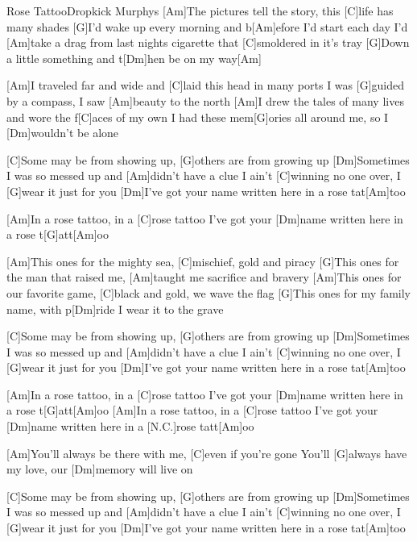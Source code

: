 \documentclass[../main.tex]{subfiles}
\begin{document}
\begin{song}{Rose Tattoo}{Dropkick Murphys}{}
[Am]The pictures tell the story, this [C]life has many shades
[G]I’d wake up every morning and b[Am]efore I’d start each day
I’d [Am]take a drag from last nights cigarette that [C]smoldered in it’s tray
[G]Down a little something and t[Dm]hen be on my way[Am]{\hh}

[Am]I traveled far and wide and [C]laid this head in many ports
I was [G]guided by a compass, I saw [Am]beauty to the north
[Am]I drew the tales of many lives and wore the f[C]aces of my own
I had these mem[G]ories all around me, so I [Dm]wouldn’t be alone

[C]Some may be from showing up, [G]others are from growing up
[Dm]Sometimes I was so messed up and [Am]didn’t have a clue
I ain’t [C]winning no one over, I [G]wear it just for you
[Dm]I’ve got your name written here in a rose tat[Am]too

[Am]In a rose tattoo, in a [C]rose tattoo
I’ve got your [Dm]name written here in a rose t[G]att[Am]oo

[Am]This ones for the mighty sea, [C]mischief, gold and piracy
[G]This ones for the man that raised me, [Am]taught me sacrifice and bravery
[Am]This ones for our favorite game, [C]black and gold, we wave the flag
[G]This ones for my family name, with p[Dm]ride I wear it to the grave

[C]Some may be from showing up, [G]others are from growing up
[Dm]Sometimes I was so messed up and [Am]didn’t have a clue
I ain’t [C]winning no one over, I [G]wear it just for you
[Dm]I’ve got your name written here in a rose tat[Am]too

[Am]In a rose tattoo, in a [C]rose tattoo
I’ve got your [Dm]name written here in a rose t[G]att[Am]oo
[Am]In a rose tattoo, in a [C]rose tattoo
I’ve got your [Dm]name written here in a [N.C.]rose tatt[Am]oo

[Am]You’ll always be there with me, [C]even if you’re gone
You’ll [G]always have my love, our [Dm]memory will live on

[C]Some may be from showing up, [G]others are from growing up
[Dm]Sometimes I was so messed up and [Am]didn’t have a clue
I ain’t [C]winning no one over, I [G]wear it just for you
[Dm]I’ve got your name written here in a rose tat[Am]too

\end{song}
\end{document}
